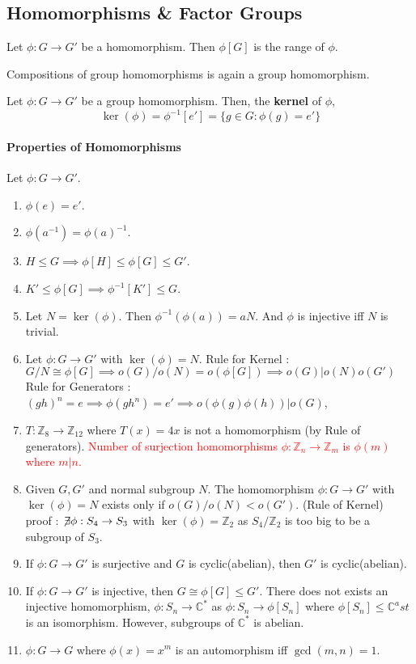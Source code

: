 \subsection{Homomorphisms \& Factor Groups}
\begin{definition}
	Let $\phi : G \to G'$ be a homomorphism.
	Then $\phi[G]$ is the range of $\phi$.
\end{definition}
	Compositions of group homomorphisms is again a group homomorphism.

\begin{definition}
	Let $\phi : G \to G'$ be a group homomorphism.
	Then, the \textbf{kernel} of $\phi$, 
	$$ \ker(\phi) = \phi^{-1}[e'] = \{ g \in G : \phi(g) = e' \} $$
\end{definition}

\paragraph{Properties of Homomorphisms}
Let $\phi : G \to G'$.
\begin{enumerate}
	\item $\phi(e) = e'$.
	\item $\phi(a^{-1}) = \phi(a)^{-1}$.
	\item $H \le G \implies \phi[H] \le \phi[G] \le G'$.
	\item $K' \le \phi[G] \implies \phi^{-1}[K'] \le G$.
	\item Let $N = \ker(\phi)$. Then $\phi^{-1}(\phi(a)) = aN$. And $\phi$ is injective iff $N$ is trivial.
	\item Let $\phi : G \to G'$ with $\ker(\phi)=N$.
		\subitem Rule for Kernel : $G/N \cong \phi[G] \implies o(G)/o(N) = o(\phi[G]) \implies o(G) | o(N)o(G')$
		\subitem Rule for Generators : $(gh)^n = e \implies \phi(gh^n) = e' \implies o(\phi(g) \phi(h))|o(G)$,
	\item $T : \mathbb{Z}_8 \to \mathbb{Z}_{12}$ where $T(x)=4x$ is not a homomorphism (by Rule of generators).
		\subitem \textcolor{red}{Number of surjection homomorphisms $\phi : \mathbb{Z}_n \to \mathbb{Z}_m$ is $\phi(m)$ where $m|n$.}
	\item Given $G,G'$ and normal subgroup $N$. The homomorphism $\phi : G \to G'$ with $\ker(\phi)=N$ exists only if $o(G)/o(N) < o(G')$. (Rule of Kernel)\\
	proof : $\not\!\exists \phi : S_4 \to S_3$ with $\ker(\phi) = \mathbb{Z}_2$ as $S_4/\mathbb{Z}_2$ is too big to be a subgroup of $S_3$.
	\item If $\phi : G \to G'$ is surjective and $G$ is cyclic(abelian), then $G'$ is cyclic(abelian).
	\item If $\phi : G \to G'$ is injective, then $G \cong \phi[G] \le G'$.
		\subitem There does not exists an injective homomorphism, $\phi : S_n \to \mathbb{C}^\ast$ as $\phi : S_n \to \phi[S_n]$ where $\phi[S_n] \le \mathbb{C}^ast$ is an isomorphism. However, subgroups of $\mathbb{C}^\ast$ is abelian.
	\item $\phi : G \to G$ where $\phi(x)=x^m$ is an automorphism iff $\gcd(m,n) = 1$.
\end{enumerate}

